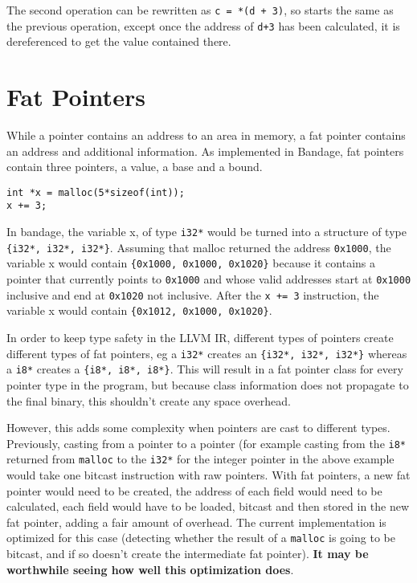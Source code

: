 The second operation can be rewritten as \verb!c = *(d + 3)!, so starts the same as the previous operation, except once the address of \verb!d+3! has been calculated, it is dereferenced to get the value contained there.

\section{Fat Pointers}
While a pointer contains an address to an area in memory, a fat pointer contains an address and additional information.
As implemented in Bandage, fat pointers contain three pointers, a value, a base and a bound.

\begin{verbatim}
int *x = malloc(5*sizeof(int));
x += 3;
\end{verbatim}

In bandage, the variable x, of type \verb!i32*! would be turned into a structure of type \verb!{i32*, i32*, i32*}!.
Assuming that malloc returned the address \verb!0x1000!, the variable x would contain \verb!{0x1000, 0x1000, 0x1020}! because it contains a pointer that currently points to \verb!0x1000! and whose valid addresses start at \verb!0x1000! inclusive and end at \verb!0x1020! not inclusive.
After the \verb!x += 3! instruction, the variable x would contain \verb!{0x1012, 0x1000, 0x1020}!.

In order to keep type safety in the LLVM IR, different types of pointers create different types of fat pointers, eg a \verb!i32*! creates an \verb!{i32*, i32*, i32*}! whereas a \verb!i8*! creates a \verb!{i8*, i8*, i8*}!.
This will result in a fat pointer class for every pointer type in the program, but because class information does not propagate to the final binary, this shouldn't create any space overhead.

However, this adds some complexity when pointers are cast to different types.
Previously, casting from a pointer to a pointer (for example casting from the \verb!i8*! returned from \verb!malloc! to the \verb!i32*! for the integer pointer in the above example would take one bitcast instruction with raw pointers.
With fat pointers, a new fat pointer would need to be created, the address of each field would need to be calculated, each field would have to be loaded, bitcast and then stored in the new fat pointer, adding a fair amount of overhead.
The current implementation is optimized for this case (detecting whether the result of a \verb!malloc! is going to be bitcast, and if so doesn't create the intermediate fat pointer).
\textbf{It may be worthwhile seeing how well this optimization does}.

